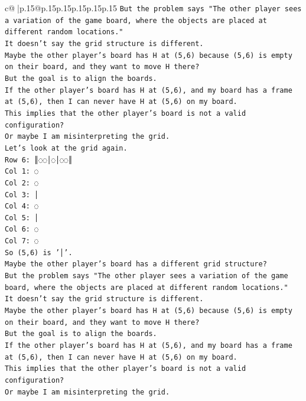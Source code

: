 \documentclass{article}
\begin{document}
{\begin{supertabular}{c@{$\;$}|p{.15\linewidth}@{}p{.15\linewidth}p{.15\linewidth}p{.15\linewidth}p{.15\linewidth}p{.15\linewidth}}
{{{\texttt{But the problem says "The other player sees a variation of the game board, where the objects are placed at different random locations."} \\
\texttt{It doesn't say the grid structure is different.} \\
\texttt{Maybe the other player's board has H at (5,6) because (5,6) is empty on their board, and they want to move H there?} \\
\texttt{But the goal is to align the boards.} \\
\texttt{If the other player's board has H at (5,6), and my board has a frame at (5,6), then I can never have H at (5,6) on my board.} \\
\texttt{This implies that the other player's board is not a valid configuration?} \\
\texttt{Or maybe I am misinterpreting the grid.} \\
\texttt{Let's look at the grid again.} \\
\texttt{Row 6: ║◌◌│◌│◌◌║} \\
\texttt{Col 1: ◌} \\
\texttt{Col 2: ◌} \\
\texttt{Col 3: │} \\
\texttt{Col 4: ◌} \\
\texttt{Col 5: │} \\
\texttt{Col 6: ◌} \\
\texttt{Col 7: ◌} \\
\texttt{So (5,6) is '│'.} \\
\texttt{Maybe the other player's board has a different grid structure?} \\
\texttt{But the problem says "The other player sees a variation of the game board, where the objects are placed at different random locations."} \\
\texttt{It doesn't say the grid structure is different.} \\
\texttt{Maybe the other player's board has H at (5,6) because (5,6) is empty on their board, and they want to move H there?} \\
\texttt{But the goal is to align the boards.} \\
\texttt{If the other player's board has H at (5,6), and my board has a frame at (5,6), then I can never have H at (5,6) on my board.} \\
\texttt{This implies that the other player's board is not a valid configuration?} \\
\texttt{Or maybe I am misinterpreting the grid.} \\
}}}
\end{supertabular}}
\end{document}
